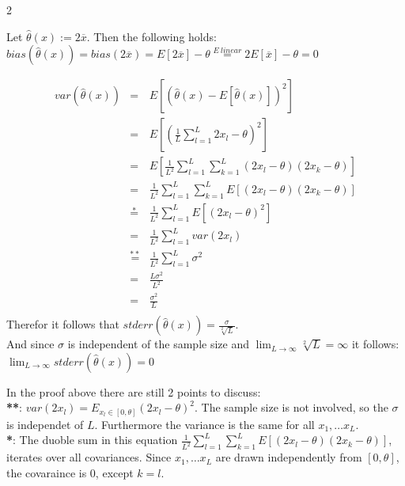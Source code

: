 \documentclass{article}
\begin{document}
\begin{ukon-infie}[3.12.17]{2}
\begin{exercise}[p=20]{}
		\question{}
		{
			Let $\hat{\theta}(x) := 2\overline{x}$. Then the following holds:\\
			$bias(\hat{\theta}(x)) = bias(2 \overline{x}) = E[2 \overline{x}] - \theta \stackrel{E ~linear}{=}2 E[\overline{x}] - \theta = 0$
		}
		
		\question{}
		{
			\begin{eqnarray*}
			var(\hat{\theta}(x))
			&=& E\left[(\hat{\theta}(x) - E[\hat{\theta}(x)])^2\right] \\
			&=& E\left[\left(\frac{1}{L}\sum_{l = 1}^L 2x_l - \theta\right)^2\right] \\
			&=& E\left[\frac{1}{L^2}\sum_{l = 1}^L\sum_{k=1}^L (2x_l - \theta)(2x_k - \theta)\right] \\
			&=& \frac{1}{L^2}\sum_{l = 1}^L\sum_{k=1}^L E\left[(2x_l - \theta)(2x_k - \theta)\right] \\
			&\stackrel{*}{=}& \frac{1}{L^2} \sum_{l = 1}^L E\left[(2x_l - \theta)^2\right] \\
			&=& \frac{1}{L^2} \sum_{l = 1}^L var(2x_l) \\
			&\stackrel{**}{=}&\frac{1}{L^2} \sum_{l = 1}^L \sigma^2 \\
			&=& \frac{L \sigma^2}{L^2}  \\
			&=& \frac{\sigma^2}{L}  \\
			\end{eqnarray*}
			Therefor it follows that $stderr(\hat{\theta}(x)) = \frac{\sigma}{\sqrt[2]{L}}$.\\
			And since $\sigma$ is independent of the sample size and $\lim_{L \to \infty} \sqrt[2]{L} = \infty$ it follows:\\
			$\lim_{L \to \infty} stderr(\hat{\theta}(x)) = 0$
			
			In the proof above there are still 2 points to discuss:\\
			
			\textbf{**}: $var(2x_l) = E_{x_l \in [0,\theta]} (2x_l - \theta)^2$. The sample size is not involved, so the $\sigma$ is independet of $L$. Furthermore the variance is the same for all $x_1, \dots x_L$.\\
			
			\textbf{*}: The duoble sum in this equation $\frac{1}{L^2}\sum_{l = 1}^L\sum_{k=1}^L E\left[(2x_l - \theta)(2x_k - \theta)\right] $, iterates over all covariances. Since $x_1, \dots x_L$ are drawn independently from $[0, \theta]$, the covaraince is 0, except $k=l$.
			
		}
		

\end{exercise}
\end{ukon-infie}
\end{document}
